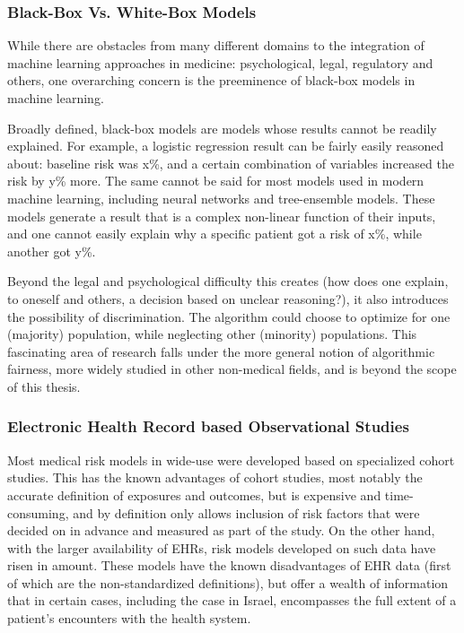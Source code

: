 \documentclass[a4paper,12pt]{article}
\begin{document}
			\subsubsection{Black-Box Vs. White-Box Models}
			While there are obstacles from many different domains to the integration of machine learning approaches in medicine: psychological, legal, regulatory and others, one overarching concern is the preeminence of black-box models in machine learning\cite{Price2015}.
			
			Broadly defined, black-box models are models whose results cannot be readily explained. For example, a logistic regression result can be fairly easily reasoned about: baseline risk was x\%, and a certain combination of variables increased the risk by y\% more. The same cannot be said for most models used in modern machine learning, including neural networks and tree-ensemble models. These models generate a result that is a complex non-linear function of their inputs, and one cannot easily explain why a specific patient got a risk of x\%, while another got y\%.
			
			Beyond the legal and psychological difficulty this creates (how does one explain, to oneself and others, a decision based on unclear reasoning?), it also introduces the possibility of discrimination. The algorithm could choose to optimize for one (majority) population, while neglecting other (minority) populations\cite{Hebert-Johnson2017}. This fascinating area of research falls under the more general notion of algorithmic fairness, more widely studied in other non-medical fields\cite{Corbett-Davies2017}, and is beyond the scope of this thesis.
			
			\subsubsection{Electronic Health Record based Observational Studies}
		
			Most medical risk models in wide-use were developed based on specialized cohort studies\cite{Goldstein2016}. This has the known advantages of cohort studies, most notably the accurate definition of exposures and outcomes, but is expensive and time-consuming, and by definition only allows inclusion of risk factors that were decided on in advance and measured as part of the study. On the other hand, with the larger availability of EHRs, risk models developed on such data have risen in amount. These models have the known disadvantages of EHR data (first of which are the non-standardized definitions), but offer a wealth of information that in certain cases, including the case in Israel\cite{Lovis2015}, encompasses the full extent of a patient's encounters with the health system\cite{Goldstein2017}.
			
\end{document}
